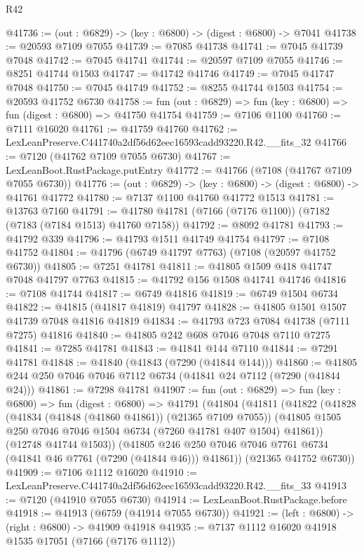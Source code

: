 \begin{lexlean}{R42}
\begin{coremodule}
{@41736 := (out : @6829) -> (key : @6800) -> (digest : @6800) -> @7041
@41738 := @20593 @7109 @7055
@41739 := @7085 @41738
@41741 := @7045 @41739 @7048
@41742 := @7045 @41741
@41744 := @20597 @7109 @7055
@41746 := @8251 @41744 @1503
@41747 := @41742 @41746
@41749 := @7045 @41747 @7048
@41750 := @7045 @41749
@41752 := @8255 @41744 @1503
@41754 := @20593 @41752 @6730
@41758 := fun (out : @6829) => fun (key : @6800) => fun (digest : @6800) => @41750 @41754
@41759 := @7106 @1100
@41760 := @7111 @16020
@41761 := @41759 @41760
@41762 := LexLeanPreserve.C441740a2df56d62eec16593cadd93220.R42.__fits_32
@41766 := @7120 (@41762 @7109 @7055 @6730)
@41767 := LexLeanBoot.RustPackage.putEntry
@41772 := @41766 (@7108 (@41767 @7109 @7055 @6730))
@41776 := (out : @6829) -> (key : @6800) -> (digest : @6800) -> @41761 @41772
@41780 := @7137 @1100 @41760 @41772 @1513
@41781 := @13763 @7160
@41791 := @41780 @41781 (@7166 (@7176 @1100)) (@7182 (@7183 (@7184 @1513) @41760 @7158))
@41792 := @8092 @41781
@41793 := @41792 @339
@41796 := @41793 @1511 @41749 @41754
@41797 := @7108 @41752
@41804 := @41796 (@6749 @41797 @7763) (@7108 (@20597 @41752 @6730))
@41805 := @7251 @41781
@41811 := @41805 @1509 @418 @41747 @7048 @41797 @7763
@41815 := @41792 @156 @1508 @41741 @41746
@41816 := @7108 @41744
@41817 := @6749 @41816
@41819 := @6749 @1504 @6734
@41822 := @41815 (@41817 @41819) @41797
@41828 := @41805 @1501 @1507 @41739 @7048 @41816 @41819
@41834 := @41793 @723 @7084 @41738 (@7111 @7275) @41816
@41840 := @41805 @242 @608 @7046 @7048 @7110 @7275
@41841 := @7285 @41781
@41843 := @41841 @144 @7110
@41844 := @7291 @41781
@41848 := @41840 (@41843 (@7290 (@41844 @144)))
@41860 := @41805 @244 @250 @7046 @7046 @7112 @6734 (@41841 @24 @7112 (@7290 (@41844 @24)))
@41861 := @7298 @41781
@41907 := fun (out : @6829) =>
  fun (key : @6800) =>
  fun (digest : @6800) =>
  @41791
    (@41804
      (@41811
        (@41822
          (@41828
            (@41834 (@41848 (@41860 @41861)) (@21365 @7109 @7055))
            (@41805 @1505 @250 @7046 @7046 @1504 @6734 (@7260 @41781 @407 @1504) @41861))
          (@12748 @41744 @1503))
        (@41805 @246 @250 @7046 @7046 @7761 @6734 (@41841 @46 @7761 (@7290 (@41844 @46))) @41861))
      (@21365 @41752 @6730))
@41909 := @7106 @1112 @16020
@41910 := LexLeanPreserve.C441740a2df56d62eec16593cadd93220.R42.__fits_33
@41913 := @7120 (@41910 @7055 @6730)
@41914 := LexLeanBoot.RustPackage.before
@41918 := @41913 (@6759 (@41914 @7055 @6730))
@41921 := (left : @6800) -> (right : @6800) -> @41909 @41918
@41935 := @7137
    @1112
    @16020
    @41918
    @1535
    @17051
    (@7166 (@7176 @1112))
}
\end{coremodule}
\end{lexlean}
